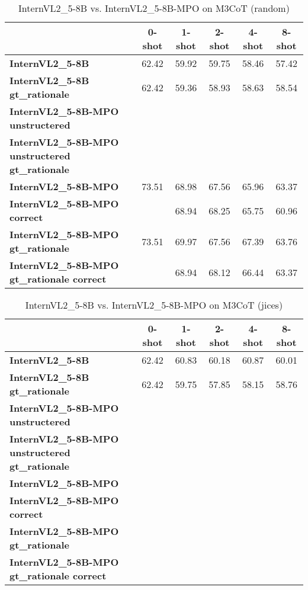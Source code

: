 \begin{table}
\caption{InternVL2\_5-8B vs. InternVL2\_5-8B-MPO on M3CoT (random)}
\label{tab:InternVL2_5-8B_M3CoT_TRAIN_random}
\begin{tabular}{lccccc}
\toprule
 & 0-shot & 1-shot & 2-shot & 4-shot & 8-shot \\
\midrule
\textbf{InternVL2\_5-8B} & 62.42 & 59.92 & 59.75 & 58.46 & 57.42 \\
\textbf{InternVL2\_5-8B gt\_rationale} & 62.42 & 59.36 & 58.93 & 58.63 & 58.54 \\
\textbf{InternVL2\_5-8B-MPO unstructered} &  &  &  &  &  \\
\textbf{InternVL2\_5-8B-MPO unstructered gt\_rationale} &  &  &  &  &  \\
\textbf{InternVL2\_5-8B-MPO} & 73.51 & 68.98 & 67.56 & 65.96 & 63.37 \\
\textbf{InternVL2\_5-8B-MPO correct} &  & 68.94 & 68.25 & 65.75 & 60.96 \\
\textbf{InternVL2\_5-8B-MPO gt\_rationale} & 73.51 & 69.97 & 67.56 & 67.39 & 63.76 \\
\textbf{InternVL2\_5-8B-MPO gt\_rationale correct} &  & 68.94 & 68.12 & 66.44 & 63.37 \\
\bottomrule
\end{tabular}
\end{table}


\begin{table}
\caption{InternVL2\_5-8B vs. InternVL2\_5-8B-MPO on M3CoT (jices)}
\label{tab:InternVL2_5-8B_M3CoT_TRAIN_jices}
\begin{tabular}{lccccc}
\toprule
 & 0-shot & 1-shot & 2-shot & 4-shot & 8-shot \\
\midrule
\textbf{InternVL2\_5-8B} & 62.42 & 60.83 & 60.18 & 60.87 & 60.01 \\
\textbf{InternVL2\_5-8B gt\_rationale} & 62.42 & 59.75 & 57.85 & 58.15 & 58.76 \\
\textbf{InternVL2\_5-8B-MPO unstructered} &  &  &  &  &  \\
\textbf{InternVL2\_5-8B-MPO unstructered gt\_rationale} &  &  &  &  &  \\
\textbf{InternVL2\_5-8B-MPO} &  &  &  &  &  \\
\textbf{InternVL2\_5-8B-MPO correct} &  &  &  &  &  \\
\textbf{InternVL2\_5-8B-MPO gt\_rationale} &  &  &  &  &  \\
\textbf{InternVL2\_5-8B-MPO gt\_rationale correct} &  &  &  &  &  \\
\bottomrule
\end{tabular}
\end{table}



